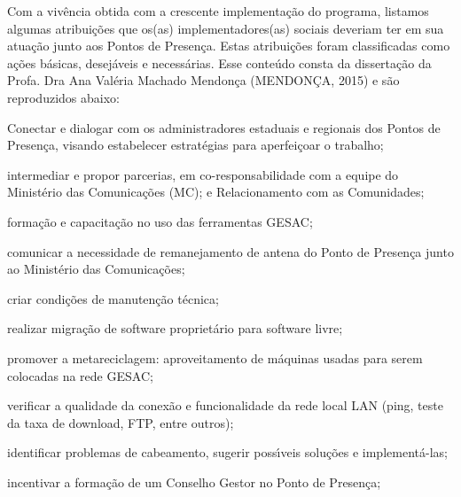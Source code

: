\documentclass[
12pt,		%
openright,	%
twoside,  %
a4paper,			%
chapter=TITLE,		%
english,			%
french,				%
spanish,			%
brazil				%
]{USPSC-classe/USPSC}
\begin{document}
\noindent\begin{center}\mbox{\centering{}}\end{center}


Com a viv\^encia obtida com a crescente implementa\c{c}\~ao do programa, listamos  algumas atribui\c{c}\~oes que os(as) implementadores(as) sociais deveriam ter em sua atua\c{c}\~ao junto aos Pontos de Presen\c{c}a. Estas atribui\c{c}\~oes foram classificadas como a\c{c}\~oes b\'asicas, desej\'aveis e necess\'arias. Esse conte\'udo consta da disserta\c{c}\~ao da Profa. Dra Ana Val\'eria Machado Mendon\c{c}a  (MENDON\c{C}A, 2015) e s\~ao reproduzidos abaixo:









\begin{alineas}
\item Conectar e dialogar com os administradores estaduais e regionais dos Pontos de Presen\c{c}a, visando estabelecer estrat\'egias para aperfei\c{c}oar o trabalho;
\item intermediar e propor parcerias, em co-responsabilidade com a equipe do Minist\'erio das Comunica\c{c}\~oes (MC); e Relacionamento com as Comunidades;
\item forma\c{c}\~ao e capacita\c{c}\~ao no uso das ferramentas GESAC;
\item comunicar a  necessidade de remanejamento de antena  do Ponto de Presen\c{c}a junto ao Minist\'erio das Comunica\c{c}\~oes;
\item criar condi\c{c}\~oes de manuten\c{c}\~ao t\'ecnica;
\item realizar migra\c{c}\~ao de software propriet\'ario para software livre;
\item promover a metareciclagem: aproveitamento de m\'aquinas usadas para serem colocadas na rede GESAC;
\item verificar a qualidade da conex\~ao e  funcionalidade da rede local LAN (ping, teste da taxa de download, FTP, entre outros);
\item identificar problemas de cabeamento, sugerir poss\'{\i}veis solu\c{c}\~oes e implement\'a-las;
\item incentivar a forma\c{c}\~ao de um Conselho Gestor no Ponto de Presen\c{c}a;
\end{alineas}
\end{document}
